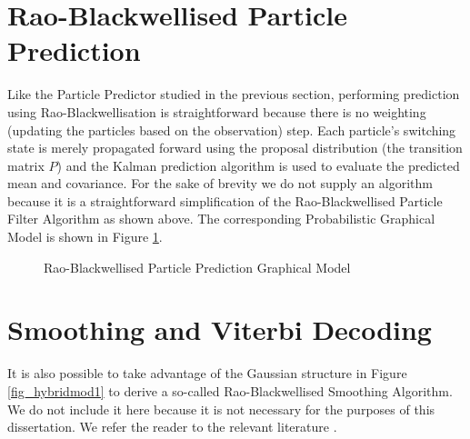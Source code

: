 \section{Rao-Blackwellised Particle Prediction}
Like the Particle Predictor studied in the previous section, performing prediction using Rao-Blackwellisation is straightforward because there is no weighting (updating the particles based on the observation) step. Each particle's switching state is merely propagated forward using the proposal distribution (the transition matrix $P$) and the Kalman prediction algorithm is used to evaluate the predicted mean and covariance. For the sake of brevity we do not supply an algorithm because it is a straightforward simplification of the Rao-Blackwellised Particle Filter Algorithm as shown above. The corresponding Probabilistic Graphical Model is shown in Figure \ref{fig_hybridmod1_prediction}.
\begin{figure}[H] 
\centering
{}
\caption{Rao-Blackwellised Particle Prediction Graphical Model}
\label{fig_hybridmod1_prediction}
\end{figure}

\section{Smoothing and Viterbi Decoding}
It is also possible to take advantage of the Gaussian structure in Figure \ref{fig_hybridmod1} to derive a so-called Rao-Blackwellised Smoothing Algorithm. We do not include it here because it is not necessary for the purposes of this dissertation. We refer the reader to the relevant literature \cite{chen}\cite{doucet}. 

